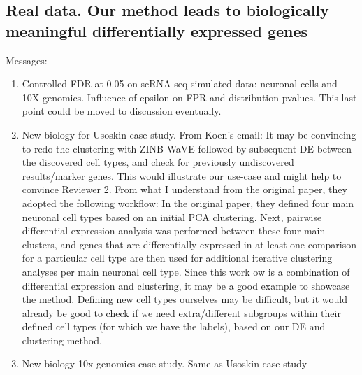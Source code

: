 \documentclass{bmcart}
\begin{document}
\subsection*{Real data. Our method leads to biologically meaningful differentially expressed genes}

{\color{blue} Messages:
\begin{enumerate}
\item Controlled FDR at 0.05 on scRNA-seq simulated data: neuronal cells and 10X-genomics. Influence of epsilon on FPR and distribution pvalues. This last point could be moved to discussion eventually.

\item New biology for Usoskin case study. From Koen's email: It may be convincing to redo the clustering with ZINB-WaVE followed by subsequent DE between the discovered cell types, and check for previously undiscovered results/marker genes. This would illustrate our use-case and might help to convince Reviewer 2. From what I understand from the original paper, they adopted the following workflow: In the original paper, they defined four main neuronal cell types based on an initial PCA clustering. Next, pairwise differential expression analysis was performed between these four main clusters, and genes that are differentially expressed in at least one comparison for a particular cell type are then used for additional iterative clustering analyses per main neuronal cell type. Since this work ow is a combination of differential expression and clustering, it may be a good example to showcase the method. Defining new cell types ourselves may be difficult, but it would already be good to check if we need extra/different subgroups within their defined cell types (for which we have the labels), based on our DE and clustering method.

\item New biology 10x-genomics case study. Same as Usoskin case study
\end{enumerate}
}
\end{document}
